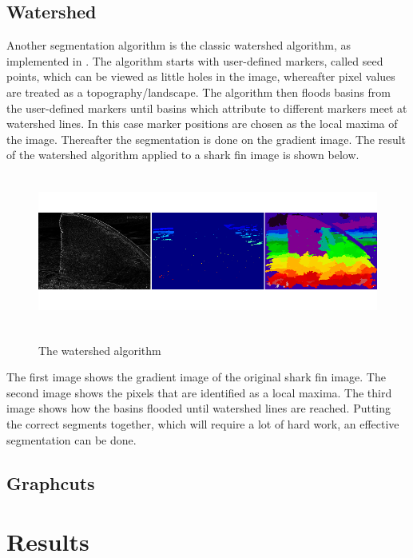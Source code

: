 \documentclass[a4paper,10pt]{article}
\begin{document}
\subsection{Watershed}
Another segmentation algorithm is the classic watershed algorithm, as
implemented in \cite{scikit}.  The algorithm starts with user-defined markers,
called seed points, which can be viewed as little holes in the image, whereafter
pixel values are treated as a topography/landscape.  The algorithm then floods
basins from the user-defined markers until basins which attribute to different
markers meet at watershed lines.  In this case marker positions are chosen as
the local maxima of the image.  Thereafter the segmentation is done on the
gradient image.  The result of the watershed algorithm applied to a shark fin
image is shown below.

\begin{figure}[H]
\centering
\includegraphics[width=5in,height=2in]{watershed.png} 
\label{fig1}
\caption{The watershed algorithm}
\end{figure}

\noindent The first image shows the gradient image of the original shark fin
image.  The second image shows the pixels that are identified as a local maxima.
 The third image shows how the basins flooded until watershed lines are reached.
 Putting the correct segments together, which will require a lot of hard work,
an effective segmentation can be done.

\subsection{Graphcuts}

\section{Results}
\subsection{}
\end{document}
